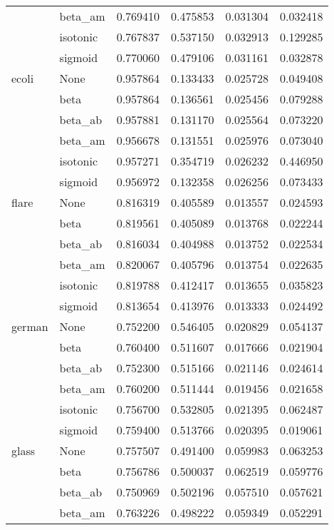\begin{tabular}{llrrrr}
        & beta\_am &  0.769410 &  0.475853 &  0.031304 &  0.032418 \\
        & isotonic &  0.767837 &  0.537150 &  0.032913 &  0.129285 \\
        & sigmoid &  0.770060 &  0.479106 &  0.031161 &  0.032878 \\
ecoli & None &  0.957864 &  0.133433 &  0.025728 &  0.049408 \\
        & beta &  0.957864 &  0.136561 &  0.025456 &  0.079288 \\
        & beta\_ab &  0.957881 &  0.131170 &  0.025564 &  0.073220 \\
        & beta\_am &  0.956678 &  0.131551 &  0.025976 &  0.073040 \\
        & isotonic &  0.957271 &  0.354719 &  0.026232 &  0.446950 \\
        & sigmoid &  0.956972 &  0.132358 &  0.026256 &  0.073433 \\
flare & None &  0.816319 &  0.405589 &  0.013557 &  0.024593 \\
        & beta &  0.819561 &  0.405089 &  0.013768 &  0.022244 \\
        & beta\_ab &  0.816034 &  0.404988 &  0.013752 &  0.022534 \\
        & beta\_am &  0.820067 &  0.405796 &  0.013754 &  0.022635 \\
        & isotonic &  0.819788 &  0.412417 &  0.013655 &  0.035823 \\
        & sigmoid &  0.813654 &  0.413976 &  0.013333 &  0.024492 \\
german & None &  0.752200 &  0.546405 &  0.020829 &  0.054137 \\
        & beta &  0.760400 &  0.511607 &  0.017666 &  0.021904 \\
        & beta\_ab &  0.752300 &  0.515166 &  0.021146 &  0.024614 \\
        & beta\_am &  0.760200 &  0.511444 &  0.019456 &  0.021658 \\
        & isotonic &  0.756700 &  0.532805 &  0.021395 &  0.062487 \\
        & sigmoid &  0.759400 &  0.513766 &  0.020395 &  0.019061 \\
glass & None &  0.757507 &  0.491400 &  0.059983 &  0.063253 \\
        & beta &  0.756786 &  0.500037 &  0.062519 &  0.059776 \\
        & beta\_ab &  0.750969 &  0.502196 &  0.057510 &  0.057621 \\
        & beta\_am &  0.763226 &  0.498222 &  0.059349 &  0.052291 \\

\end{tabular}
